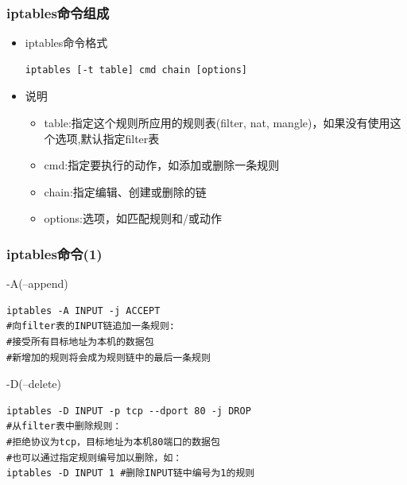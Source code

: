 \documentclass[xcolor=svgnames,presentation]{beamer}
\begin{document}
\begin{frame}[fragile]
\frametitle{iptables命令组成}
\label{sec-2-13}
\begin{itemize}

\item iptables命令格式\\
\label{sec-2-13-1}%
\begin{verbatim}
iptables [-t table] cmd chain [options]
\end{verbatim}

\item 说明
\label{sec-2-13-2}%
\begin{itemize}

\item table:指定这个规则所应用的规则表(filter, nat, mangle)，如果没有使用这个选项,默认指定filter表
\label{sec-2-13-2-1}%

\item cmd:指定要执行的动作，如添加或删除一条规则
\label{sec-2-13-2-2}%

\item chain:指定编辑、创建或删除的链
\label{sec-2-13-2-3}%

\item options:选项，如匹配规则和/或动作
\label{sec-2-13-2-4}%
\end{itemize} %
\end{itemize} %
\end{frame}
\begin{frame}[fragile]
\frametitle{iptables命令(1)}
\label{sec-2-14}
\begin{exampleblock}{-A(--append)}
\label{sec-2-14-1}


\begin{verbatim}
iptables -A INPUT -j ACCEPT
#向filter表的INPUT链追加一条规则:
#接受所有目标地址为本机的数据包
#新增加的规则将会成为规则链中的最后一条规则
\end{verbatim}
\end{exampleblock}
\begin{block}{-D(--delete)}
\label{sec-2-14-2}


\begin{verbatim}
iptables -D INPUT -p tcp --dport 80 -j DROP
#从filter表中删除规则：
#拒绝协议为tcp，目标地址为本机80端口的数据包
#也可以通过指定规则编号加以删除，如：
iptables -D INPUT 1 #删除INPUT链中编号为1的规则
\end{verbatim}
\end{block}
\end{frame}
\end{document}
